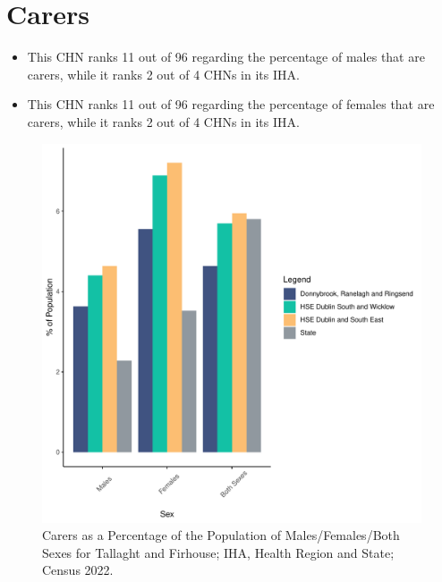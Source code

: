 \documentclass{article}
\begin{document}
\section{Carers}\label{sect:Carers}
\begin{itemize}
\item This CHN ranks  11 out of 96 regarding the percentage of males that are carers, while it ranks   2 out of 4 CHNs in its IHA.
\item This CHN ranks  11 out of 96 regarding the percentage of females that are carers, while it ranks   2 out of 4 CHNs in its IHA.
\end{itemize}
\begin{figure}[H]
	\centering
	\includegraphics[width = 150mm]{../figures/CareED.pdf}
	\caption{Carers as a Percentage of the Population of Males/Females/Both Sexes for Tallaght and Firhouse; IHA, Health Region and State; Census 2022.}
	\label{fig:2ae19629-1a6a-13a3-e055-000000000001}
	\end{figure}
\end{document}
